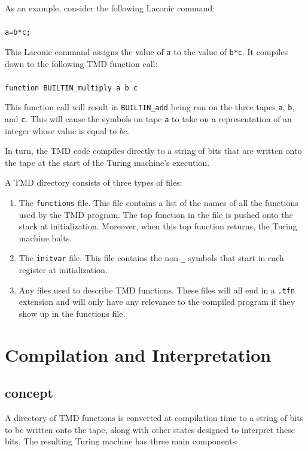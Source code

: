 \documentclass[11pt]{article}
\begin{document}
As an example, consider the following Laconic command: \\ \\
\texttt{a=b*c;} 

This Laconic command assigns the value of \texttt{a} to the value of \texttt{b*c}. It compiles down to the following TMD function call: \\ \\
\texttt{function BUILTIN\_multiply a b c}

This function call will result in \texttt{BUILTIN\_add} being run on the three tapes \texttt{a}, \texttt{b}, and \texttt{c}. This will cause the symbols on tape \texttt{a} to take on a representation of an integer whose value is equal to $bc$.

In turn, the TMD code compiles directly to a string of bits that are written onto the tape at the start of the Turing machine's execution.

A TMD directory consists of three types of files:

\begin{enumerate}
\item The \texttt{functions} file. This file contains a list of the names of all the functions used by the TMD program. The top function in the file is pushed onto the stack at initialization. Moreover, when this top function returns, the Turing machine halts.
\item The \texttt{initvar} file. This file contains the non-\texttt{\_} symbols that start in each register at initialization. 
\item Any files used to describe TMD functions. These files will all end in a \texttt{.tfn} extension and will only have any relevance to the compiled program if they show up in the functions file.
\end{enumerate}

\section{Compilation and Interpretation}

\subsection{concept}

A directory of TMD functions is converted at compilation time to a string of bits to be written onto the tape, along with other states designed to interpret these bits. The resulting Turing machine has three main components:
\end{document}
